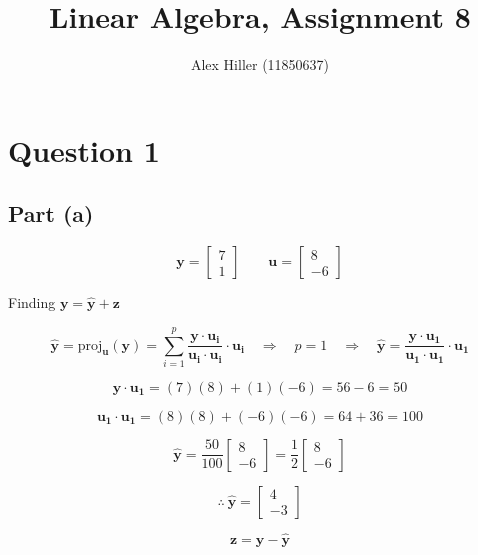 \documentclass{article}
\author{Alex Hiller (11850637)}
\title{Linear Algebra, Assignment 8}
\begin{document}
\maketitle

\clearpage
\section{Question 1} 
\subsection{Part (a)} 
\[%
    \mathbf{y}
    =
    \begin{bmatrix} 7\\1 \end{bmatrix}
    \qquad
    \mathbf{u}
    =
    \begin{bmatrix} 8\\-6 \end{bmatrix}
\]%

Finding $\mathbf{y}=\mathbf{\hat{y}+\mathbf{z}}$

\[%
    \mathbf{\hat{y}} 
    =
    \text{proj}_{\mathbf{u}}\left(\mathbf{y}\right)
    =
    \sum_{i=1}^{p} \frac{\mathbf{y} \cdot \mathbf{u_i} }{\mathbf{u_i} \cdot
    \mathbf{u_i}}  \cdot \mathbf{u_i}
    \quad
    \Rightarrow 
    \quad
    p=1
    \quad 
    \Rightarrow 
    \quad 
    \mathbf{\hat{y}}
    =
    \frac{\mathbf{y} \cdot \mathbf{u_1}}{\mathbf{u_1}  \cdot \mathbf{u_1}}
    \cdot \mathbf{u_1}
\]%

\[%
    \mathbf{y} \cdot \mathbf{u_1} 
    =
    (7)(8)+(1)(-6)
    =
    56-6
    =
    50
\]%


\[%
    \mathbf{u_1} \cdot \mathbf{u_1}
    =
    (8)(8)+(-6)(-6)
    =
    64+36
    =
    100
\]%

\[%
    \mathbf{\hat{y}}
    =
    \frac{50}{100} 
    \begin{bmatrix} 8\\-6 \end{bmatrix}
    =
    \frac{1}{2} 
    \begin{bmatrix} 8\\-6 \end{bmatrix}
\]%

\[%
    \therefore \
    \mathbf{\hat{y}}=
    \begin{bmatrix} 4\\-3 \end{bmatrix}
\]%


\[%
    \mathbf{z}
    =
    \mathbf{y}
    -
    \mathbf{\hat{y}}
\]%
\end{document}
